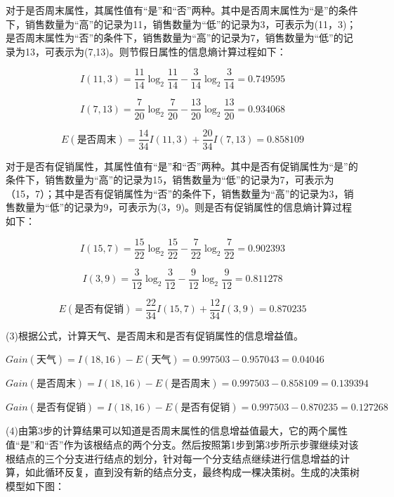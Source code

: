 对于是否周末属性，其属性值有“是”和“否”两种。其中是否周末属性为“是”的条件下，销售数量为“高”的记录为11，销售数量为“低”的记录为3，可表示为(11，3)；是否周末属性为“否”的条件下，销售数量为“高”的记录为7，销售数量为“低”的记录为13，可表示为(7,13)。则节假日属性的信息熵计算过程如下：

\begin{equation}
I(11,3)=\frac{11}{14}\log_2\frac{11}{14}-\frac{3}{14}\log_2\frac{3}{14}=0.749595
\end{equation}

\begin{equation}
I(7,13)=\frac{7}{20}\log_2\frac{7}{20}-\frac{13}{20}\log_2\frac{13}{20}=0.934068
\end{equation}

\begin{equation}
E(\mbox{是否周末})=\frac{14}{34}I(11,3)+\frac{20}{34}I(7,13)=0.858109
\end{equation}

对于是否有促销属性，其属性值有“是”和“否”两种。其中是否有促销属性为“是”的条件下，销售数量为“高”的记录为15，销售数量为“低”的记录为7，可表示为（15，7）；其中是否有促销属性为“否”的条件下，销售数量为“高”的记录为3，销售数量为“低”的记录为9，可表示为(3，9)。则是否有促销属性的信息熵计算过程如下：

\begin{equation}
I(15,7)=\frac{15}{22}\log_2\frac{15}{22}-\frac{7}{22}\log_2\frac{7}{22}=0.902393
\end{equation}

\begin{equation}
I(3,9)=\frac{3}{12}\log_2\frac{3}{12}-\frac{9}{12}\log_2\frac{9}{12}=0.811278
\end{equation}

\begin{equation}
E(\mbox{是否有促销})=\frac{22}{34}I(15,7)+\frac{12}{34}I(3,9)=0.870235
\end{equation}

(3)根据公式，计算天气、是否周末和是否有促销属性的信息增益值。

$Gain(\mbox{天气})=I(18,16)-E(\mbox{天气})=0.997503-0.957043=0.04046$

$Gain(\mbox{是否周末})=I(18,16)-E(\mbox{是否周末})=0.997503-0.858109=0.139394$

$Gain(\mbox{是否有促销})=I(18,16)-E(\mbox{是否有促销})=0.997503-0.870235=0.127268$

(4)由第3步的计算结果可以知道是否周末属性的信息增益值最大，它的两个属性值“是”和“否”作为该根结点的两个分支。然后按照第1步到第3步所示步骤继续对该根结点的三个分支进行结点的划分，针对每一个分支结点继续进行信息增益的计算，如此循环反复，直到没有新的结点分支，最终构成一棵决策树。生成的决策树模型如下图：

